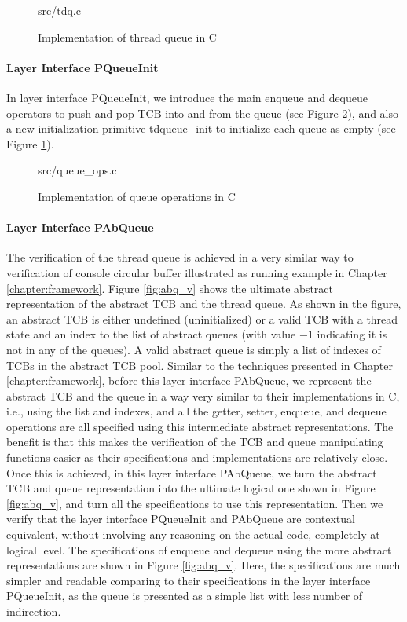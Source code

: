 \begin{figure}
	 {src/tdq.c}
	\caption{Implementation of thread queue in C}
	\label{fig:tdq_c}
\end{figure}

\paragraph{Layer Interface PQueueInit}

In layer interface PQueueInit, we introduce the main \textsf{enqueue} and \textsf{dequeue} operators
to push and pop TCB into and from the queue (see Figure \ref{fig:queue_ops_c}), and also a new
initialization primitive \textsf{tdqueue\_init} to initialize each queue as empty (see Figure \ref{fig:tdq_c}).

\begin{figure}
	 {src/queue_ops.c}
	\caption{Implementation of queue operations in C}
	\label{fig:queue_ops_c}
\end{figure}

\paragraph{Layer Interface PAbQueue}

The verification of the thread queue is achieved in a very similar way to
verification of console circular buffer illustrated as running example in Chapter \ref{chapter:framework}.
Figure \ref{fig:abq_v} shows the ultimate abstract representation of the abstract TCB and the thread queue.
As shown in the figure, an abstract TCB is either undefined (uninitialized) or a valid TCB with a thread state
and an index to the list of abstract queues (with value $-1$ indicating it is not in any of the queues).
A valid abstract queue is simply a list of indexes of TCBs in the abstract TCB pool.
Similar to the techniques presented in Chapter \ref{chapter:framework}, before this layer interface
PAbQueue, we represent the abstract TCB and the queue in a way very similar to their implementations in C, i.e.,
using the list and indexes, and all the getter, setter, enqueue, and dequeue operations are all specified using
this intermediate abstract representations. The benefit is that this makes the verification of the TCB and queue
manipulating functions easier as their specifications and implementations are relatively close.
Once this is achieved, in this layer interface PAbQueue, we turn the abstract TCB and queue representation
into the ultimate logical one shown in Figure \ref{fig:abq_v}, and turn all the specifications to use this representation.
Then we verify that the layer interface PQueueInit and PAbQueue are contextual equivalent, without involving any
reasoning on the actual code, completely at logical level.
The specifications of \textsf{enqueue} and \textsf{dequeue} using the more abstract representations are
shown in Figure \ref{fig:abq_v}. Here, the specifications are much simpler and readable comparing to their
specifications in the layer interface PQueueInit, as the queue is presented as a simple list with less number of
indirection.

